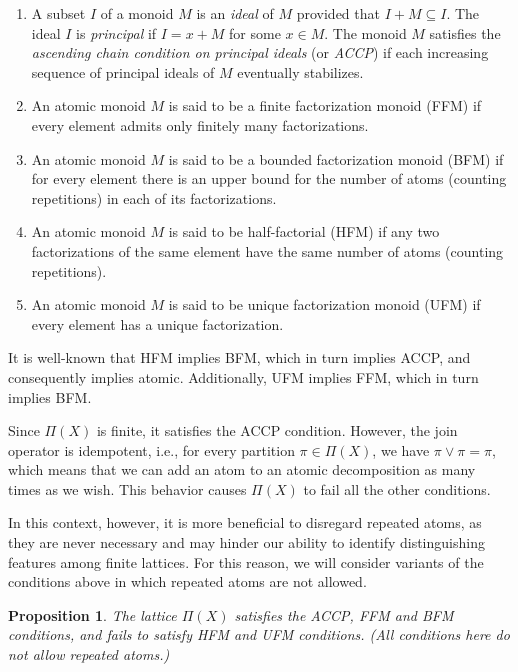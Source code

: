 \documentclass[12pt]{extarticle}
\newtheorem{Proposition}{Proposition}
\begin{document}
\begin{enumerate}
	\item  A subset $I$ of a monoid $M$ is an \emph{ideal} of $M$ provided that $I + M \subseteq I$. The ideal $I$ is \emph{principal} if $I = x + M$ for some $x \in M$. The monoid $M$ satisfies the \emph{ascending chain condition on principal ideals} (or \emph{ACCP}) if each increasing sequence of principal ideals of $M$ eventually stabilizes.
	\item An atomic monoid $M$ is said to be
	a finite factorization monoid (FFM) if every element admits only finitely many factorizations. 
	\item An atomic monoid $M$ is said to be a bounded factorization monoid (BFM) if for every element there is an upper bound for the number
	of atoms (counting repetitions) in each of its factorizations.
	\item An atomic
	monoid $M$ is said to be half-factorial (HFM) if any two factorizations of the same element have the same number of
	atoms (counting repetitions).
	\item An atomic
	monoid $M$ is said to be unique factorization monoid (UFM) if every element has a unique factorization.
\end{enumerate}
	
It is well-known that HFM implies BFM, which in turn implies ACCP, and consequently implies atomic. Additionally, UFM implies FFM, which in turn implies BFM. 

Since $\Pi(X)$ is finite, it satisfies the ACCP condition. However, the join operator is idempotent, i.e., for every partition $\pi\in\Pi(X)$, we have $\pi\vee\pi=\pi$, which means that we can add an atom to an atomic decomposition as many times as we wish. This behavior causes $\Pi(X)$ to fail all the other conditions.

In this context, however, it is more beneficial to disregard repeated atoms, as they are never necessary and may hinder our ability to identify distinguishing features among finite lattices. For this reason, we will consider variants of the conditions above in which repeated atoms are not allowed.

\begin{Proposition} The lattice $\Pi(X)$ satisfies the ACCP, FFM and BFM conditions, and fails to satisfy HFM and UFM conditions. (All conditions here do not allow repeated atoms.)
\end{Proposition}
\end{document}
